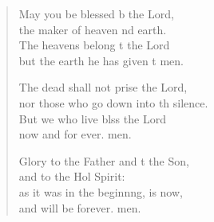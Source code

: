 \begin{verse}
\begin{patverse}
May you be blessed b the Lord,\Med\\
the maker of heaven nd earth.\\
The heavens belong t the Lord\Med\\
but the earth he has given t men.

The dead shall not prise the Lord,\Med\\
nor those who go down into th silence.\\
But we who live blss the Lord\Med\\
now and for ever. men.

Glory to the Father and t the Son,\Med\\
and to the Hol Spirit:\\
as it was in the beginn\pointup{\i}ng, is now,\Med\\
and will be forever. men. 
  \end{patverse}
\end{verse}
